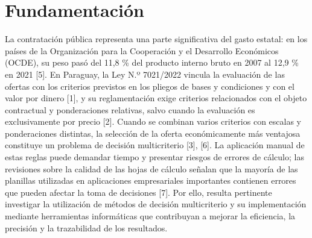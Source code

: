 \documentclass[12pt,a4paper]{article}
\begin{document}
\section{Fundamentación}

La contratación pública representa una parte significativa del gasto estatal: en los países de la Organización para la Cooperación y el Desarrollo Económicos (OCDE), su peso pasó del 11,8 \% del producto interno bruto en 2007 al 12,9 \% en 2021 [5]. En Paraguay, la Ley N.º 7021/2022 vincula la evaluación de las ofertas con los criterios previstos en los pliegos de bases y condiciones y con el valor por dinero [1], y su reglamentación exige criterios relacionados con el objeto contractual y ponderaciones relativas, salvo cuando la evaluación es exclusivamente por precio [2]. Cuando se combinan varios criterios con escalas y ponderaciones distintas, la selección de la oferta económicamente más ventajosa constituye un problema de decisión multicriterio [3], [6]. La aplicación manual de estas reglas puede demandar tiempo y presentar riesgos de errores de cálculo; las revisiones sobre la calidad de las hojas de cálculo señalan que la mayoría de las planillas utilizadas en aplicaciones empresariales importantes contienen errores que pueden afectar la toma de decisiones [7]. Por ello, resulta pertinente investigar la utilización de métodos de decisión multicriterio y su implementación mediante herramientas informáticas que contribuyan a mejorar la eficiencia, la precisión y la trazabilidad de los resultados.
\end{document}
